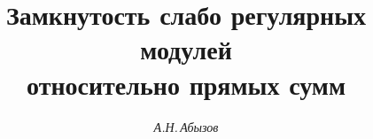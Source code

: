 

 


% 


 


\newcommand{\tts}[1]{} 


 




\setcounter{page}{3} 












 


\author{\it А.Н.\,Абызов} 




\title{Замкнутость слабо регулярных модулей\\  


относительно прямых сумм} 


 


\date{} 




\pagestyle{plain} %


 




\maketitle 


\label{begin} 


 


